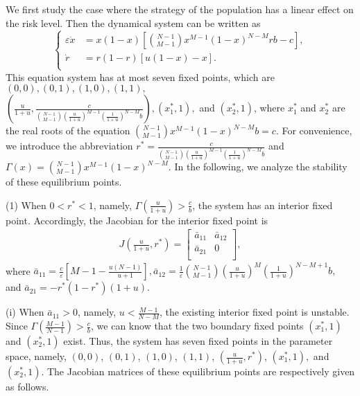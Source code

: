 \documentclass[9pt]{elife}
\begin{document}
\begin{appendixbox}\label{appendix1}

We first study the case where the strategy of the population has a linear effect on the risk level. Then the dynamical system can be written as
\begin{equation*}
\left\{
\begin{aligned}
\varepsilon\dot{x}&=x(1-x)[\binom{N-1}{M-1}x^{M-1}(1-x)^{N-M}rb-c],\\
\dot{r}&=r(1-r)[u(1-x)-x].\\
\end{aligned}
\right.
\end{equation*}
This equation system has at most seven fixed points, which are $(0, 0), (0, 1), (1, 0), (1, 1),$\\ $(\frac{u}{1+u}, \frac{c}{\binom{N-1}{M-1}(\frac{u}{1+u})^{M-1}(\frac{1}{1+u})^{N-M} b}), (x_{1}^{*}, 1),$ and $(x_{2}^{*}, 1)$, where $x_{1}^{*}$ and $x_{2}^{*}$ are the real roots of the equation $\binom{N-1}{M-1}x^{M-1}(1-x)^{N-M} b=c$. For convenience, we introduce the abbreviation $r^{*}=\frac{c}{\binom{N-1}{M-1}(\frac{u}{1+u})^{M-1}(\frac{1}{1+u})^{N-M} b}$ and $\Gamma(x)=\binom{N-1}{M-1}x^{M-1}(1-x)^{N-M}$. In the following, we analyze the stability of these equilibrium points.

(1) When $0<r^{*}<1$, namely, $\Gamma(\frac{u}{1+u})>\frac{c}{b}$, the system has an interior fixed point. Accordingly, the Jacobian for the interior fixed point is
\begin{eqnarray*}
J(\frac{u}{1+u},  r^{*}) =
  \left[ {\begin{array}{cc}
    \bar{a}_{11} &  \bar{a}_{12}\\
    \bar{a}_{21} & 0 \\
  \end{array} } \right],
\end{eqnarray*}
where $\bar{a}_{11}=\frac{c}{\varepsilon}[M-1-\frac{u(N-1)}{u+1}], \bar{a}_{12}=\frac{1}{\varepsilon}\binom{N-1}{M-1}(\frac{u}{1+u})^{M}(\frac{1}{1+u})^{N-M+1}b,$ and $\bar{a}_{21}=-r^{*}(1-r^{*})(1+u)$.

(i) When $\bar{a}_{11}>0$, namely, $u<\frac{M-1}{N-M}$, the existing interior fixed point is unstable. Since $\Gamma(\frac{M-1}{N-1})>\frac{c}{b}$, we can know that the two boundary fixed points $(x_{1}^{*}, 1)$ and $(x_{2}^{*}, 1)$ exist. Thus, the system has seven fixed points in the parameter space, namely, $(0, 0)$, $(0, 1)$, $(1, 0)$, $(1, 1)$, $(\frac{u}{1+u}, r^{*})$, $(x_{1}^{*}, 1),$ and $(x_{2}^{*}, 1)$. The Jacobian matrices of these equilibrium points are respectively given as follows.


\end{appendixbox}
\end{document}

